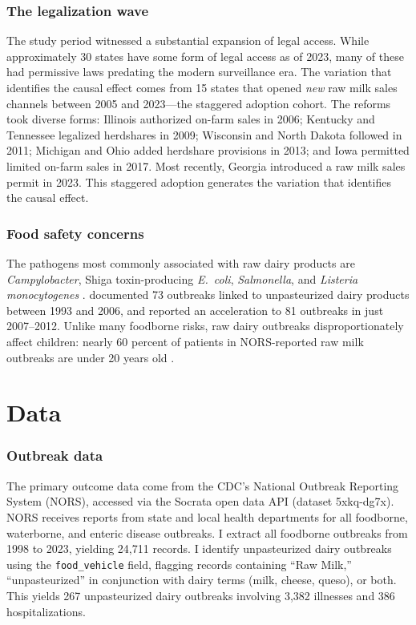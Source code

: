 \documentclass[12pt]{article}
\begin{document}
\subsubsection*{The legalization wave} The study period witnessed a substantial expansion of legal access. While approximately 30 states have some form of legal access as of 2023, many of these had permissive laws predating the modern surveillance era. The variation that identifies the causal effect comes from 15 states that opened \textit{new} raw milk sales channels between 2005 and 2023---the staggered adoption cohort. The reforms took diverse forms: Illinois authorized on-farm sales in 2006; Kentucky and Tennessee legalized herdshares in 2009; Wisconsin and North Dakota followed in 2011; Michigan and Ohio added herdshare provisions in 2013; and Iowa permitted limited on-farm sales in 2017. Most recently, Georgia introduced a raw milk sales permit in 2023. This staggered adoption generates the variation that identifies the causal effect.

\subsubsection*{Food safety concerns} The pathogens most commonly associated with raw dairy products are \textit{Campylobacter}, Shiga toxin-producing \textit{E.\ coli}, \textit{Salmonella}, and \textit{Listeria monocytogenes} \citep{Oliver2009}. \citet{Langer2012} documented 73 outbreaks linked to unpasteurized dairy products between 1993 and 2006, and \citet{Mungai2015} reported an acceleration to 81 outbreaks in just 2007--2012. Unlike many foodborne risks, raw dairy outbreaks disproportionately affect children: nearly 60 percent of patients in NORS-reported raw milk outbreaks are under 20 years old \citep{CDC_rawmilk2023}.


\section{Data}

\subsubsection*{Outbreak data} The primary outcome data come from the CDC's National Outbreak Reporting System (NORS), accessed via the Socrata open data API (dataset 5xkq-dg7x). NORS receives reports from state and local health departments for all foodborne, waterborne, and enteric disease outbreaks. I extract all foodborne outbreaks from 1998 to 2023, yielding 24,711 records. I identify unpasteurized dairy outbreaks using the \texttt{food\_vehicle} field, flagging records containing ``Raw Milk,'' ``unpasteurized'' in conjunction with dairy terms (milk, cheese, queso), or both. This yields 267 unpasteurized dairy outbreaks involving 3,382 illnesses and 386 hospitalizations.
\end{document}
